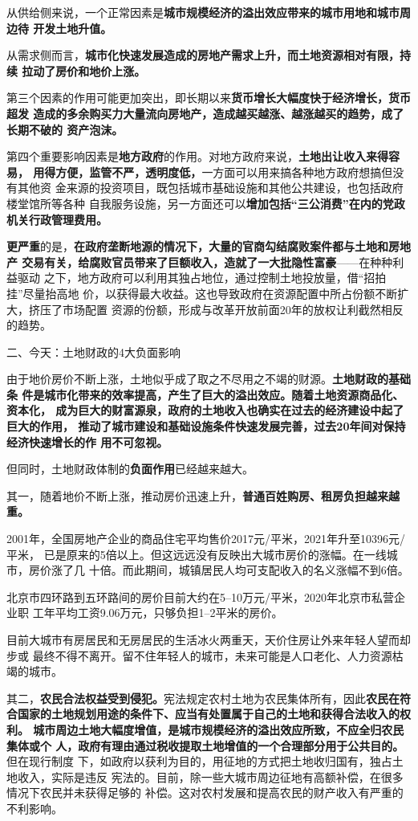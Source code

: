 从供给侧来说，一个正常因素是\textbf{城市规模经济的溢出效应带来的城市用地和城市周边待
开发土地升值。}

从需求侧而言，\textbf{城市化快速发展造成的房地产需求上升，而土地资源相对有限，持续
  拉动了房价和地价上涨。}

第三个因素的作用可能更加突出，即长期以来\textbf{货币增长大幅度快于经济增长，货币超发
造成的多余购买力大量流向房地产，造成越买越涨、越涨越买的趋势，成了长期不破的
资产泡沫。}

第四个重要影响因素是\textbf{地方政府}的作用。对地方政府来说，\textbf{土地出让收入来得容易，
  用得方便，监管不严，透明度低，}一方面可以用来搞各种地方政府想搞但没有其他资
金来源的投资项目，既包括城市基础设施和其他公共建设，也包括政府楼堂馆所等各种
自我服务设施，另一方面还可以\textbf{增加包括“三公消费”在内的党政机关行政管理费用。}

\textbf{更严重}的是，\textbf{在政府垄断地源的情况下，大量的官商勾结腐败案件都与土地和房地产
  交易有关，给腐败官员带来了巨额收入，造就了一大批隐性富豪}——在种种利益驱动
之下，地方政府可以利用其独占地位，通过控制土地投放量，借“招拍挂”尽量抬高地
价，以获得最大收益。这也导致政府在资源配置中所占份额不断扩大，挤压了市场配置
资源的份额，形成与改革开放前面20年的放权让利截然相反的趋势。

{\heiti 二、今天：土地财政的4大负面影响}

由于地价房价不断上涨，土地似乎成了取之不尽用之不竭的财源。\textbf{土地财政的基础条
  件是城市化带来的效率提高，产生了巨大的溢出效应。随着土地资源商品化、资本化，
  成为巨大的财富源泉，政府的土地收入也确实在过去的经济建设中起了巨大的作用，
  推动了城市建设和基础设施条件快速发展完善，过去20年间对保持经济快速增长的作
  用不可忽视。}

但同时，土地财政体制的\textbf{负面作用}已经越来越大。

其一，随着地价不断上涨，推动房价迅速上升，\textbf{普通百姓购房、租房负担越来越重。}

2001年，全国房地产企业的商品住宅平均售价2017元/平米，2021年升至10396元/平米，
已是原来的5倍以上。但这远远没有反映出大城市房价的涨幅。在一线城市，房价涨了几
十倍。而此期间，城镇居民人均可支配收入的名义涨幅不到6倍。

北京市四环路到五环路间的房价目前大约在5--10万元/平米，2020年北京市私营企业职
工年平均工资9.06万元，只够负担1--2平米的房价。

目前大城市有房居民和无房居民的生活冰火两重天，天价住房让外来年轻人望而却步或
最终不得不离开。留不住年轻人的城市，未来可能是人口老化、人力资源枯竭的城市。

其二，\textbf{农民合法权益受到侵犯。}宪法规定农村土地为农民集体所有，因此\textbf{农民在符
  合国家的土地规划用途的条件下、应当有处置属于自己的土地和获得合法收入的权利。
  城市周边土地大幅度增值，是城市规模经济的溢出效应所致，不应全归农民集体或个
  人，政府有理由通过税收提取土地增值的一个合理部分用于公共目的。}但在现行制度
下，如政府以获利为目的，用征地的方式把土地收归国有，独占土地收入，实际是违反
宪法的。目前，除一些大城市周边征地有高额补偿，在很多情况下农民并未获得足够的
补偿。这对农村发展和提高农民的财产收入有严重的不利影响。

